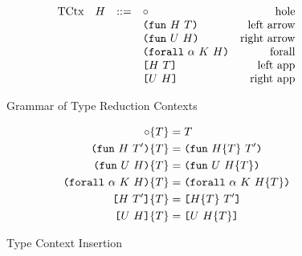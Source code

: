 \documentclass[../main.tex]{subfiles}
\begin{document}
\begin{figure*}
    \centering
    \[\begin{array}{lrclr}
        \textrm{TCtx} & H  & ::= & \circ{}                                  & \textrm{hole}\\
                      &    &     & \texttt{(} \mathtt{fun} ~ H ~ T \texttt{)}                        & \textrm{left arrow}\\
                      &    &     & \texttt{(} \mathtt{fun} ~ U ~ H \texttt{)}                       & \textrm{right arrow}\\
                      &    &     & \texttt{(} \mathtt{forall} ~ \alpha ~ K ~ H \texttt{)}                 & \textrm{forall}\\
                      &    &     & \texttt{[} H ~ T \texttt{]}                        & \textrm{left app}\\
                      &    &     & \texttt{[} U ~ H \texttt{]}                       & \textrm{right app}\\
    \end{array}\]
    
    \caption{Grammar of Type Reduction Contexts}
    \label{fig:Plutus_core_type_reduction_contexts}
\end{figure*}




\begin{figure*}[t]
    \begin{align*}
        \circ{}\{T\}                                         &= T\\
        \texttt{(} \mathtt{fun} ~ H ~ T' \texttt{)}\{T\}                              &= \texttt{(} \mathtt{fun} ~ H\{T\} ~ T' \texttt{)}\\
        \texttt{(} \mathtt{fun} ~ U ~ H \texttt{)}\{T\}                              &= \texttt{(} \mathtt{fun} ~ U ~ H\{T\} \texttt{)}\\
        \texttt{(} \mathtt{forall} ~ \alpha ~ K ~ H \texttt{)}\{T\}                        &= \texttt{(} \mathtt{forall} ~ \alpha ~ K ~ H\{T\} \texttt{)}\\
        \texttt{[} H ~ T' \texttt{]}\{T\}                              &= \texttt{[} H\{T\} ~ T' \texttt{]}\\
        \texttt{[} U ~ H \texttt{]}\{T\}                              &= \texttt{[} U ~ H\{T\} \texttt{]}\\
    \end{align*}
    
    \caption{Type Context Insertion}
    \label{fig:Plutus_core_type_context_insertion}
\end{figure*}
\end{document}
